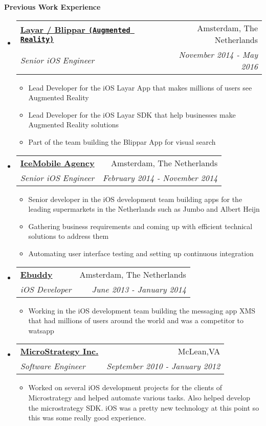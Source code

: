 \documentclass[letterpaper,11pt]{article}
\makeatletter
\newcommand{\resitem}[1]{\item #1 \vspace{-2pt}}
\newcommand{\resheading}[1]{{\large \colorbox{mygrey}{\begin{minipage}{\textwidth}{\textbf{#1 \vphantom{p\^{E}}}}\end{minipage}}}}
\newcommand{\ressubheading}[4]{
\begin{tabular*}{7.0in}{l@{\extracolsep{\fill}}r}
    \textbf{#1} & #2 \\
    \textit{#3} & \textit{#4} \\
\end{tabular*}\vspace{-6pt}}
\makeatother
\begin{document}
\resheading{Previous Work Experience}
\begin{itemize}

\item
    \ressubheading{\href{https://www.layar.com/}{Layar / Blippar \texttt{(Augmented Reality)}}}{Amsterdam, The Netherlands}{Senior iOS Engineer}{November 2014 - May 2016}
    \begin{itemize}
        \resitem{Lead Developer for the iOS Layar App that makes millions of users see Augmented Reality}
        \resitem{Lead Developer for the iOS Layar SDK that help businesses make Augmented Reality solutions}
        \resitem{Part of the team building the Blippar App for visual search}
    \end{itemize}

\item
    \ressubheading{\href{http://www.icemobile.com}{IceMobile Agency}}{Amsterdam, The Netherlands}{Senior iOS Engineer}{February 2014 - November 2014}
    \begin{itemize}
        \resitem{Senior developer in the iOS development team building apps for the leading supermarkets in the Netherlands such as Jumbo and Albert Heijn}
        \resitem{Gathering business requirements and coming up with efficient technical solutions to address them}
        \resitem{Automating user interface testing and setting up continuous integration}
    \end{itemize}

\item
    \ressubheading{\href{http://www.ebuddy.com}{Ebuddy}}{Amsterdam, The Netherlands}{iOS Developer}{June 2013 - January 2014}
    \begin{itemize}
        \resitem{Working in the iOS development team building the messaging app XMS that had millions of users around the world and was a competitor to watsapp}
    \end{itemize}

\item
    \ressubheading{\href{http://www.microstrategy.com/Company}{MicroStrategy Inc.}}{McLean,VA}{Software Engineer}{September 2010 - January 2012}
    \begin{itemize}
        \resitem{Worked on several iOS development projects for the clients of Microstrategy and helped automate various tasks. Also helped develop the microstrategy SDK. iOS was a pretty new technology at this point so this was some really good experience.}
    \end{itemize}
    


\end{itemize}
\end{document}
